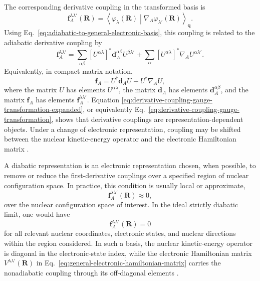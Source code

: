 \documentclass[
  11pt,
  letterpaper,
  onehalfspacing,
  normalmargins,
  equalmargins,
  oneside
]{ut-thesis}
\begin{document}
The corresponding derivative coupling in the transformed basis is
\begin{equation}
\mathbf f_A^{\lambda\lambda'}(\mathbf R)
=
\left\langle
\varphi_\lambda(\mathbf R)
\middle|
\nabla_A
\varphi_{\lambda'}(\mathbf R)
\right\rangle_{\mathbf q}.
\label{eq:general-basis-derivative-coupling}
\end{equation}
Using Eq.~\eqref{eq:adiabatic-to-general-electronic-basis}, this coupling is
related to the adiabatic derivative coupling by
\begin{equation}
\mathbf f_A^{\lambda\lambda'}
=
\sum_{\alpha\beta}
\left[U^{\alpha\lambda}\right]^\ast
\mathbf d_A^{\alpha\beta}
U^{\beta\lambda'}
+
\sum_\alpha
\left[U^{\alpha\lambda}\right]^\ast
\nabla_A U^{\alpha\lambda'} .
\label{eq:derivative-coupling-gauge-transformation-expanded}
\end{equation}
Equivalently, in compact matrix notation,
\begin{equation}
\mathbf f_A
=
U^\dagger \mathbf d_A U
+
U^\dagger \nabla_A U ,
\label{eq:derivative-coupling-gauge-transformation}
\end{equation}
where the matrix \(U\) has elements \(U^{\alpha\lambda}\), the matrix
\(\mathbf d_A\) has elements \(\mathbf d_A^{\alpha\beta}\), and the matrix
\(\mathbf f_A\) has elements \(\mathbf f_A^{\lambda\lambda'}\). Equation
\eqref{eq:derivative-coupling-gauge-transformation-expanded}, or equivalently
Eq.~\eqref{eq:derivative-coupling-gauge-transformation}, shows that
derivative couplings are representation-dependent objects. Under a change of
electronic representation, coupling may be shifted between the nuclear
kinetic-energy operator and the electronic Hamiltonian matrix
\cite{MeadTruhlar1982,Baer2006Book}.

A diabatic representation is an electronic representation chosen, when
possible, to remove or reduce the first-derivative couplings over a specified
region of nuclear configuration space. In practice, this condition is usually
local or approximate,
\begin{equation}
\mathbf f_A^{\lambda\lambda'}(\mathbf R)\approx 0,
\label{eq:diabatic-condition-approximate}
\end{equation}
over the nuclear configuration space of interest. In the ideal strictly
diabatic limit, one would have
\begin{equation}
\mathbf f_A^{\lambda\lambda'}(\mathbf R)=0
\end{equation}
for all relevant nuclear coordinates, electronic states, and nuclear
directions within the region considered. In such a basis, the nuclear
kinetic-energy operator is diagonal in the electronic-state index, while the
electronic Hamiltonian matrix \(V^{\lambda\lambda'}(\mathbf R)\) in
Eq.~\eqref{eq:general-electronic-hamiltonian-matrix} carries the nonadiabatic
coupling through its off-diagonal elements
\cite{MeadTruhlar1982,Baer2006Book}.
\end{document}
